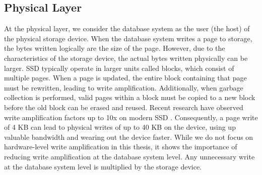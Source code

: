 \subsection*{Physical Layer}
At the physical layer, we consider the database system as the user (the host) of the physical storage device.
When the database system writes a page to storage, the bytes written logically are the size of the page.
However, due to the characteristics of the storage device, the actual bytes written physically can be larger.
\ac{SSD} typically operate in larger units called blocks, which consist of multiple pages.
When a page is updated, the entire block containing that page must be rewritten, leading to write amplification.
Additionally, when garbage collection is performed, valid pages within a block must be copied to a new block before the old block can be erased and reused.
Recent research have observed write amplification factors up to 10x on modern \ac{SSD} \cite{haas2025ssd}.
Consequently, a page write of 4 KB can lead to physical writes of up to 40 KB on the device, using up valuable bandwidth and wearing out the device faster.
While we do not focus on hardware-level write amplification in this thesis, it shows the importance of reducing write amplification at the database system level.
Any unnecessary write at the database system level is multiplied by the storage device.

